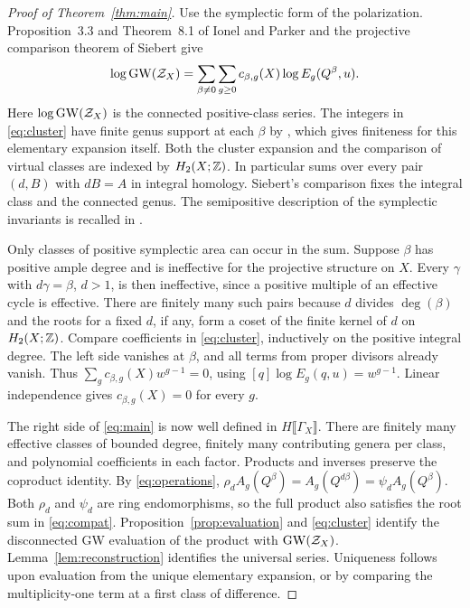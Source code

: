 \begin{proof}[Proof of Theorem~\ref{thm:main}]
Use the symplectic form of the polarization. Proposition~3.3 and
Theorem~8.1 of Ionel and Parker \cite{IP} and the projective
comparison theorem of Siebert \cite[Theorem~0.1]{Siebert} give
\begin{equation}\label{eq:cluster}
 \log\operatorname{GW}(\mathcal Z_X)=
    \sum_{\beta\ne0}\sum_{g\ge0}c_{\beta,g}(X)\log E_g(Q^\beta,u).
\end{equation}
Here $\log\operatorname{GW}(\mathcal Z_X)$ is the connected positive-class series. The
integers in \eqref{eq:cluster} have finite genus support at each
$\beta$ by \cite[Definition~3.45 and Theorem~3.50]{DIW},
which gives finiteness for this elementary expansion itself.
Both the cluster expansion and the comparison of virtual classes
are indexed by $H_2(X;\mathbb Z)$. In particular \cite[(8.9)]{IP} sums
over every pair $(d,B)$ with $dB=A$ in integral homology. Siebert's
comparison fixes the integral class and the connected genus. The
semipositive description of the symplectic invariants is recalled
in \cite[Remark~1.1]{IP}.

Only classes of positive symplectic area can occur in the sum.
Suppose $\beta$ has positive ample degree and is ineffective for
the projective structure on $X$. Every $\gamma$ with $d\gamma=\beta$,
$d>1$, is then ineffective, since a positive multiple of an
effective cycle is effective. There are finitely many such pairs
because $d$ divides $\deg(\beta)$ and the roots for a fixed $d$,
if any, form a coset of the finite kernel of $d$ on $H_2(X;\mathbb Z)$.
Compare coefficients in
\eqref{eq:cluster}, inductively on the positive integral degree.
The left side vanishes at $\beta$, and all terms from proper
divisors already vanish. Thus
$\sum_g c_{\beta,g}(X) w^{g-1}=0$, using
$[q]\log E_g(q,u)=w^{g-1}$. Linear independence gives
$c_{\beta,g}(X)=0$ for every $g$.

The right side of \eqref{eq:main} is now well defined in
$H\llbracket\Gamma_X\rrbracket$. There are finitely many effective
classes of bounded degree, finitely many contributing genera per
class, and polynomial coefficients in each factor. Products and
inverses preserve the coproduct identity. By
\eqref{eq:operations}, $\rho_d A_g(Q^\beta)=A_g(Q^{d\beta})
=\psi_d A_g(Q^\beta)$. Both $\rho_d$ and $\psi_d$ are ring
endomorphisms, so the full product also satisfies the root sum
in \eqref{eq:compat}. Proposition~\ref{prop:evaluation} and
\eqref{eq:cluster} identify the disconnected GW evaluation of
the product with $\operatorname{GW}(\mathcal Z_X)$. Lemma~\ref{lem:reconstruction}
identifies the universal series. Uniqueness follows upon evaluation
from the unique elementary expansion, or by comparing the
multiplicity-one term at a first class of difference.
\end{proof}

